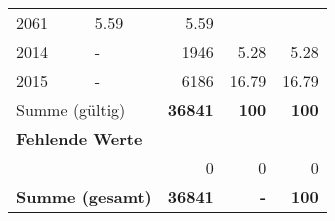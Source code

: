 \begin{longtable}{lXrrr}
       \num{2061} &
       \num[round-mode=places,round-precision=2]{5,59} &
         \num[round-mode=places,round-precision=2]{5,59} \\

     2014 &
     \multicolumn{1}{X}{ -  } &


       \num{1946} &
       \num[round-mode=places,round-precision=2]{5,28} &
         \num[round-mode=places,round-precision=2]{5,28} \\

     2015 &
     \multicolumn{1}{X}{ -  } &


       \num{6186} &
       \num[round-mode=places,round-precision=2]{16,79} &
         \num[round-mode=places,round-precision=2]{16,79} \\
     \midrule
     \multicolumn{2}{l}{Summe (gültig)} &
       \textbf{\num{36841}} &
     \textbf{100} &
       \textbf{\num[round-mode=places,round-precision=2]{100}} \\
     \multicolumn{5}{l}{\textbf{Fehlende Werte}}\\
      & & 0 & 0 & 0 \\
     \midrule
     \multicolumn{2}{l}{\textbf{Summe (gesamt)}} &
          \textbf{\num{36841}} &
        \textbf{-} &
        \textbf{100} \\
     \bottomrule
     \end{longtable}
     
